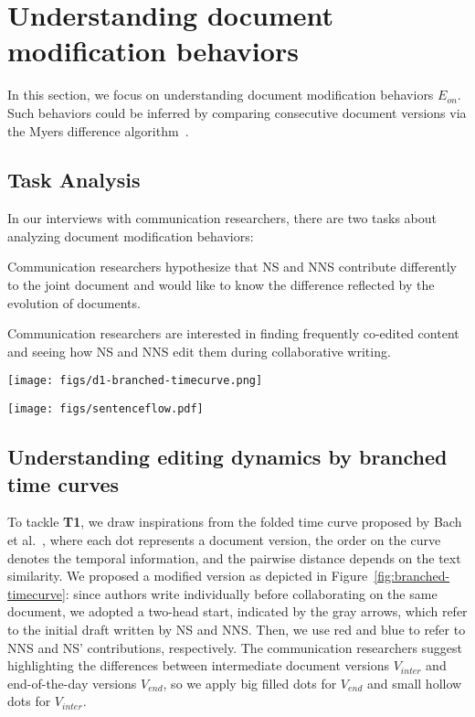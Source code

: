 \section{Understanding document modification behaviors}
In this section, we focus on understanding document modification behaviors $E_{on}$. Such behaviors could be inferred by comparing consecutive document versions via the Myers difference algorithm~\cite{myers1986nd}. 

\subsection{Task Analysis}
In our interviews with communication researchers, there are two tasks about analyzing document modification behaviors:

 Communication researchers hypothesize that NS and NNS contribute differently to the joint document and would like to know the difference reflected by the evolution of documents.

 Communication researchers are interested in finding frequently co-edited content and seeing how NS and NNS edit them during collaborative writing.


\begin{figure*}
    \centering
    \texttt{[image: figs/d1-branched-timecurve.png]}
    \caption{Branched time curves of team-1 and team-9. The gray arrows indicate the first versions written by NS and NNS. Big and filled dots are major versions, and small and hollow dots are intermediate versions.}
    \label{fig:branched-timecurve}
\end{figure*}

\begin{figure*}
    \centering
    \texttt{[image: figs/sentenceflow.pdf]}
    \caption{Sentence Flow of team-1 and team-9. Red: remove, blue: add, gray: edited by both authors.}
    \label{fig:sentence-flow}
\end{figure*}
\subsection{Understanding editing dynamics by branched time curves}

To tackle \textbf{T1}, we draw inspirations from the folded time curve proposed by Bach et al.~\cite{bach2015time}, where each dot represents a document version, the order on the curve denotes the temporal information, and the pairwise distance depends on the text similarity. We proposed a modified version as depicted in Figure~\ref{fig:branched-timecurve}: since authors write individually before collaborating on the same document, we adopted a two-head start, indicated by the gray arrows, which refer to the initial draft written by NS and NNS. Then, we use red and blue to refer to NNS and NS' contributions, respectively. The communication researchers suggest highlighting the differences between intermediate document versions $V_{inter}$ and end-of-the-day versions $V_{end}$, so we apply big filled dots for $V_{end}$ and small hollow dots for $V_{inter}$.

